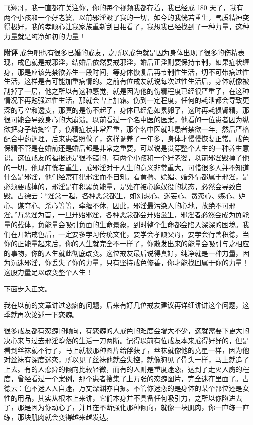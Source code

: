 \begin{case}
    飞翔哥，我一直都在关注你，你的每个视频我都存着，我已经戒 180 天了，我有两个小孩和一个好老婆，以前邪淫毁了我的一切，如今的我恍若重生，气质精神变得极好，我的孝顺心让我家族重新刮目相看了，我想我已经找到了一种力量，这种力量就是纯净如初的力量！

    \textbf{附评} 戒色吧也有很多已婚的戒友，之所以戒色就是因为身体出现了很多的伤精表现，戒色就是戒邪淫，结婚后依然要戒邪淫，婚后正淫则要保持节制，如果症状缠身，那是应该先禁欲养生一段时间，等身体恢复后再节制性生活，切不可带病过性生活，这样是有可能加重病情的。之前有位戒友就说每次过性生活后，身体就像被刮掉了一层，他之所以有这种感觉，就是因为他的伤精程度已经很严重了，在这种情况下再勉强过性生活，那就会雪上加霜。伤到一定程度，任何的耗泄都会导致更深的亏空和透支，那真的是伤不起了，身体已经危如累卵了，这时再耗损肾精，那很可能会导致身心的大崩溃。以前看过一个名中医的医案，他看的一位患者因为纵欲把身子给掏空了，伤精症状非常严重，那个名中医就叫患者禁欲一年，然后严格配合中药调理，后来患者照做了，这样调养了一年多，身体才慢慢恢复正常。戒色保精不管是在婚前还是婚后都是非常之重要，可以说是贯穿整个人生的一种养生意识。这位戒友的福报还是很不错的，有两个小孩和一个好老婆，以前邪淫毁掉了他的一切，他现在恍若重生，戒邪淫对于人生的意义非常重大，可惜很多人并不知道什么是邪淫，他们经常在犯邪淫而不自知。看黄撸、嫖娼、婚外情都属于邪淫，是必须要戒掉的，邪淫是在积累负能量，是处在被心魔奴役的状态，必然会导致自毁。古德云：“淫念一起，各种恶念都生，如幻想心、迷妄心、贪恋心、嫉心、妒心、谋夺心、杀心等等，牵缠不休，因此，邪淫最污染人的心地，故绝不可邪淫。”万恶淫为首，一旦开始邪淫，各种恶念都会开始滋生，邪淫者必然会成为负能量的载体，负能量会吸引负面的生命景象，到时整个生命都会陷入深深的困境。我们在开始戒色后，一定要多学习传统文化，要学会孝顺父母，要学会行善积德，当你的正能量起来后，你的人生就完全不一样了，你散发出来的能量会吸引与之相应的事物，你的人生就此彻底改变。这位戒友最后说得真好，纯净就是一种力量，因为沉迷邪淫，你丢失了你的力量，只有坚持戒色修善，你才能找回属于你的力量！这股力量足以改变整个人生！
\end{case}

下面步入正文。

我在以前的文章讲过恋癖的问题，后来有好几位戒友建议再详细讲讲这个问题，这季就再次论述一下恋癖。

很多戒友都有恋癖的倾向，有恋癖的人戒色的难度会增大不少，这就需要下更大的决心来与过去邪淫堕落的生活一刀两断。记得以前有位戒友本来戒得好好的，但是看到丝袜就不行了，马上就被那种图片给俘获了，丝袜就像他的克星一样，因为他对丝袜有深度迷恋，所以见了丝袜他就会失控，就像狗见了骨头一样，马上就追了上去。有的人恋癖的倾向比较轻微，而有的人则是重度迷恋，达到了走火入魔的程度，曾经看过一个案例，那个患者搜集了上万张的恋癖图片，完全迷在里面了。古德云：色不迷人人自迷，万丈深渊亦自掘。不管你迷恋的是身体的某个部位还是女性的用品，其实从根本上来讲，它们本身并不具备任何吸引力，之所以你陷进去了，那是因为你动心了，并且在不断强化那种倾向，就像一块肌肉，你一直练一直练，那块肌肉就会变得越来越发达。

